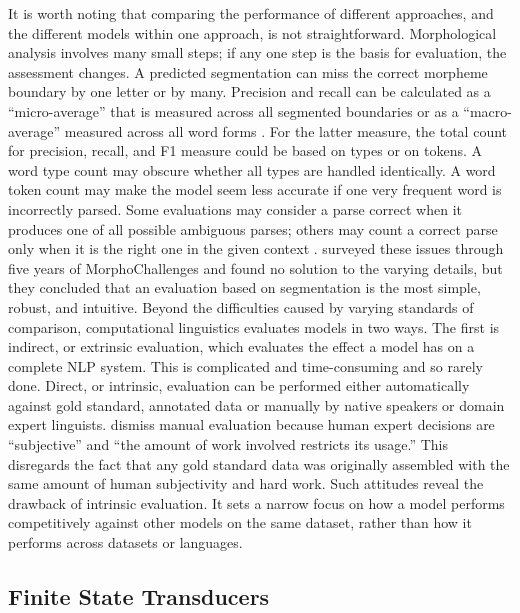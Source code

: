 \documentclass[12pt]{article}
\begin{document}
It is worth noting that comparing the performance of different approaches, and the different models within one approach, is not straightforward. Morphological analysis involves many small steps; if any one step is the basis for evaluation, the assessment changes. A predicted segmentation can miss the correct morpheme boundary by one letter or by many. Precision and recall can be calculated as a ``micro-average'' that is measured across all segmented boundaries or as a ``macro-average'' measured across all word forms \cite{ruokolainen_supervised_2013}. For the latter measure, the total count for precision, recall, and F1 measure could be based on types or on tokens. A word type count may obscure whether all types are handled identically. A word token count may make the model seem less accurate if one very frequent word is incorrectly parsed. Some evaluations may consider a parse correct when it produces one of all possible ambiguous parses; others may count a correct parse only when it is the right one in the given context \cite{ruokolainen_supervised_2013}.  surveyed these issues through five years of MorphoChallenges and found no solution to the varying details, but they concluded that an evaluation based on segmentation is the most simple, robust, and intuitive. Beyond the difficulties caused by varying standards of comparison, computational linguistics evaluates models in two ways. The first is indirect, or extrinsic evaluation, which evaluates the effect a model has on a complete NLP system. This is complicated and time-consuming and so rarely done. Direct, or intrinsic, evaluation can be performed either automatically against gold standard, annotated data or manually by native speakers or domain expert linguists.  dismiss manual evaluation because human expert decisions are ``subjective'' and ``the amount of work involved restricts its usage.'' This disregards the fact that any gold standard data was originally assembled with the same amount of human subjectivity and hard work. Such attitudes reveal the drawback of intrinsic evaluation. It sets a narrow focus on how a model performs competitively against other models on the same dataset, rather than how it performs across datasets or languages. 

\subsection{Finite State Transducers}
\label{sec:FSTs}
\end{document}
